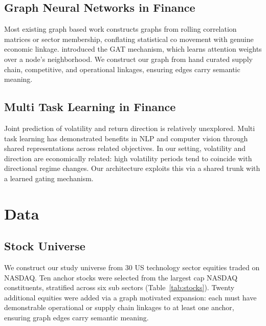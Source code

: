\documentclass[10pt, twocolumn, a4paper]{article}
\begin{document}
\subsection{Graph Neural Networks in Finance}

Most existing graph based work constructs graphs from rolling correlation
matrices or sector membership, conflating statistical co movement with
genuine economic linkage. \citet{velivckovic2018graph} introduced the GAT
mechanism, which learns attention weights over a node's neighborhood. We
construct our graph from hand curated supply chain, competitive, and
operational linkages, ensuring edges carry semantic meaning.

\subsection{Multi Task Learning in Finance}

Joint prediction of volatility and return direction is relatively unexplored.
Multi task learning has demonstrated benefits in NLP and computer vision
through shared representations across related objectives. In our setting,
volatility and direction are economically related: high volatility periods
tend to coincide with directional regime changes. Our architecture exploits
this via a shared trunk with a learned gating mechanism.


\section{Data}
\label{sec:data}

\subsection{Stock Universe}

We construct our study universe from 30 US technology sector equities traded
on NASDAQ. Ten anchor stocks were selected from the largest cap NASDAQ
constituents, stratified across six sub sectors (Table~\ref{tab:stocks}).
Twenty additional equities were added via a graph motivated expansion:
each must have demonstrable operational or supply chain linkages to at least
one anchor, ensuring graph edges carry semantic meaning.
\end{document}
